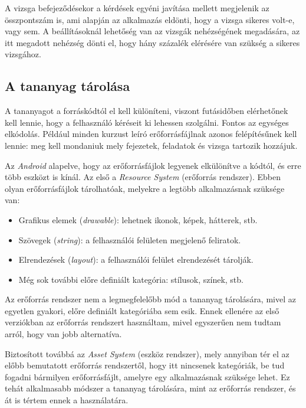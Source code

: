 \documentclass[12pt,a4paper]{article}
\begin{document}
	A vizsga befejeződésekor a kérdések egyéni javítása mellett megjelenik az összpontszám is, ami alapján az alkalmazás eldönti, hogy a vizsga sikeres volt-e, vagy sem. A beállításoknál lehetőség van az vizsgák nehézségének megadására, az itt megadott nehézség dönti el, hogy hány százalék elérésére van szükség a sikeres vizsgához.
	
	
	\subsection{A tananyag tárolása}\label{tananyag_tarolasa}
	
	A tananyagot a forráskódtól el kell különíteni, viszont futásidőben elérhetőnek kell lennie, hogy a felhasználó kéréseit ki lehessen szolgálni. Fontos az egységes elkódolás. Például minden kurzust leíró erőforrásfájlnak azonos felépítésűnek kell lennie: meg kell mondaniuk mely fejezetek, feladatok és vizsga tartozik hozzájuk.
	
	Az \textit{Android} alapelve, hogy az erőforrásfájlok legyenek elkülönítve a kódtól, és erre több eszközt is kínál. Az első a \textit{Resource System} (erőforrás rendszer). Ebben olyan erőforrásfájlok tárolhatóak, melyekre a legtöbb alkalmazásnak szüksége van:
	
	\begin{itemize}
		\item Grafikus elemek (\textit{drawable}): lehetnek ikonok, képek, hátterek, stb.
		\item Szövegek (\textit{string}): a felhasználói felületen megjelenő feliratok.
		\item Elrendezések (\textit{layout}): a felhasználói felület elrendezését tárolják.
		\item Még sok további előre definiált kategória: stílusok, színek, stb.
	\end{itemize} 

	Az erőforrás rendszer nem a legmegfelelőbb mód a tananyag tárolására, mivel az egyetlen gyakori, előre definiált kategóriába sem esik. Ennek ellenére az első verziókban az erőforrás rendszert használtam, mivel egyszerűen nem tudtam arról, hogy van jobb alternatíva.
	
	Biztosított továbbá az \textit{Asset System} (eszköz rendszer), mely annyiban tér el az előbb bemutatott erőforrás rendszertől, hogy itt nincsenek kategóriák, be tud fogadni bármilyen erőforrásfájlt, amelyre egy alkalmazásnak szüksége lehet. Ez tehát alkalmasabb módszer a tananyag tárolására, mint az erőforrás rendszer, és át is tértem ennek a használatára.
	
\end{document}
